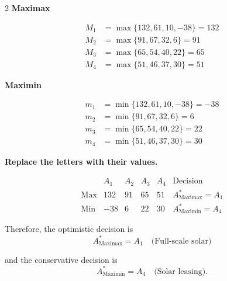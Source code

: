 {\begin{multicols}{2}
			\textbf{Maximax}
			
			\[
			\begin{array}{ll}
				M_1 &= \max\{132,61,10,-38\}=132\\
				M_2 &= \max\{91,67,32,6\}=91\\
				M_3 &= \max\{65,54,40,22\}=65\\
				M_4 &= \max\{51,46,37,30\}=51
			\end{array}
			\]
			
			\textbf{Maximin}
			
			\[
			\begin{array}{ll}
				m_1 &= \min\{132,61,10,-38\}=-38\\
				m_2 &= \min\{91,67,32,6\}=6\\
				m_3 &= \min\{65,54,40,22\}=22\\
				m_4 &= \min\{51,46,37,30\}=30
			\end{array}
			\]
			
			\columnbreak
			
			\textbf{Replace the letters with their values.}
			
			\[
			\begin{array}{c|ccccc}
				& A_1 & A_2 & A_3 & A_4 & \text{Decision}\\
				\hline
				\text{Max} &
				132 & 91 & 65 & 51 &
				A^*_{\mathrm{Maximax}}=A_1
				\\
				\text{Min} &
				-38 & 6 & 22 & 30 &
				A^*_{\mathrm{Maximin}}=A_4
			\end{array}
			\]
			
			Therefore, the optimistic decision is
			\[
			A^*_{\mathrm{Maximax}}=A_1
			\quad\text{(Full-scale solar)}
			\]
			
			and the conservative decision is
			\[
			A^*_{\mathrm{Maximin}}=A_4
			\quad\text{(Solar leasing)}.
			\]
			
		\end{multicols}
	}
			
